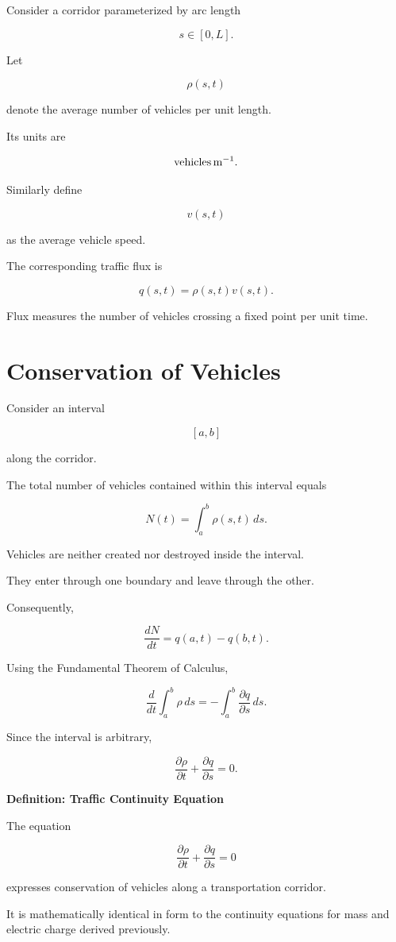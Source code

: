 \documentclass[11pt,fleqn]{book}
\numberwithin{equation}{chapter}
\newenvironment{definition}[1]
  {\begin{definitionEnv}
   \noindent\textbf{Definition: #1}\par\smallskip}
  {\end{definitionEnv}}
\theoremstyle{plain}
\theoremstyle{definition}
\theoremstyle{remark}
\begin{document}
Consider a corridor parameterized by arc length

\[
s\in[0,L].
\]

Let

\[
\rho(s,t)
\]

denote the average number of vehicles per unit length.

Its units are

\[
{\rm vehicles\,m^{-1}}.
\]

Similarly define

\[
v(s,t)
\]

as the average vehicle speed.

The corresponding traffic flux is

\[
q(s,t)
=
\rho(s,t)v(s,t).
\]

Flux measures the number of vehicles crossing a fixed point per unit
time.


\section{Conservation of Vehicles}

Consider an interval

\[
[a,b]
\]

along the corridor.

The total number of vehicles contained within this interval equals

\[
N(t)
=
\int_a^b
\rho(s,t)\,ds.
\]

Vehicles are neither created nor destroyed inside the interval.

They enter through one boundary and leave through the other.

Consequently,

\[
\frac{dN}{dt}
=
q(a,t)
-
q(b,t).
\]

Using the Fundamental Theorem of Calculus,

\[
\frac{d}{dt}
\int_a^b
\rho\,ds
=
-
\int_a^b
\frac{\partial q}{\partial s}\,ds.
\]

Since the interval is arbitrary,

\[
\boxed{
\frac{\partial\rho}{\partial t}
+
\frac{\partial q}{\partial s}
=
0.
}
\]


\begin{definition}{Traffic Continuity Equation}

The equation

\[
\frac{\partial\rho}{\partial t}
+
\frac{\partial q}{\partial s}
=
0
\]

expresses conservation of vehicles along a transportation corridor.

It is mathematically identical in form to the continuity equations for
mass and electric charge derived previously.

\end{definition}
\end{document}
